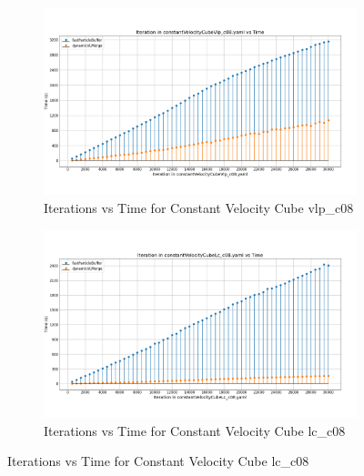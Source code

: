 \section{}
\begin{figure}[H]
\centering
\begin{subfigure}{\linewidth}
    \centering
    \includegraphics[width=\linewidth]{graphs/constantVelocityCube/normalExperiments/iter/vlpc08.png}
    \caption{Iterations vs Time for Constant Velocity Cube vlp\_c08}
    \label{fig:fallingDrop}
\end{subfigure}

\begin{subfigure}{\linewidth}
    \centering
    \includegraphics[width=\linewidth]{graphs/constantVelocityCube/normalExperiments/iter/lcc08.png}
    \caption{Iterations vs Time for Constant Velocity Cube lc\_c08}
    \label{fig:explodingLiquid}
\end{subfigure}

\label{fig:appendixGraphs}
\end{figure}

